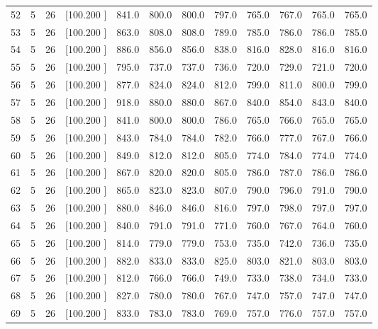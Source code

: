 \documentclass[12pt,a4paper]{article}
\begin{document}
\begin{center}
{\begin{tabular}{r r r r r r r r r r r r}
  52&  5& 26&[100.200   ]&   841.0&   800.0&   800.0&   797.0&   765.0&   767.0&   765.0&   765.0\\[-0.02in]
  53&  5& 26&[100.200   ]&   863.0&   808.0&   808.0&   789.0&   785.0&   786.0&   786.0&   785.0\\[-0.02in]
  54&  5& 26&[100.200   ]&   886.0&   856.0&   856.0&   838.0&   816.0&   828.0&   816.0&   816.0\\[-0.02in]
  55&  5& 26&[100.200   ]&   795.0&   737.0&   737.0&   736.0&   720.0&   729.0&   721.0&   720.0\\[-0.02in]
  56&  5& 26&[100.200   ]&   877.0&   824.0&   824.0&   812.0&   799.0&   811.0&   800.0&   799.0\\[-0.02in]
  57&  5& 26&[100.200   ]&   918.0&   880.0&   880.0&   867.0&   840.0&   854.0&   843.0&   840.0\\[-0.02in]
  58&  5& 26&[100.200   ]&   841.0&   800.0&   800.0&   786.0&   765.0&   766.0&   765.0&   765.0\\[-0.02in]
  59&  5& 26&[100.200   ]&   843.0&   784.0&   784.0&   782.0&   766.0&   777.0&   767.0&   766.0\\[-0.02in]
  60&  5& 26&[100.200   ]&   849.0&   812.0&   812.0&   805.0&   774.0&   784.0&   774.0&   774.0\\[-0.02in]
  61&  5& 26&[100.200   ]&   867.0&   820.0&   820.0&   805.0&   786.0&   787.0&   786.0&   786.0\\[-0.02in]
  62&  5& 26&[100.200   ]&   865.0&   823.0&   823.0&   807.0&   790.0&   796.0&   791.0&   790.0\\[-0.02in]
  63&  5& 26&[100.200   ]&   880.0&   846.0&   846.0&   816.0&   797.0&   798.0&   797.0&   797.0\\[-0.02in]
  64&  5& 26&[100.200   ]&   840.0&   791.0&   791.0&   771.0&   760.0&   767.0&   764.0&   760.0\\[-0.02in]
  65&  5& 26&[100.200   ]&   814.0&   779.0&   779.0&   753.0&   735.0&   742.0&   736.0&   735.0\\[-0.02in]
  66&  5& 26&[100.200   ]&   882.0&   833.0&   833.0&   825.0&   803.0&   821.0&   803.0&   803.0\\[-0.02in]
  67&  5& 26&[100.200   ]&   812.0&   766.0&   766.0&   749.0&   733.0&   738.0&   734.0&   733.0\\[-0.02in]
  68&  5& 26&[100.200   ]&   827.0&   780.0&   780.0&   767.0&   747.0&   757.0&   747.0&   747.0\\[-0.02in]
  69&  5& 26&[100.200   ]&   833.0&   783.0&   783.0&   769.0&   757.0&   776.0&   757.0&   757.0\\[-0.02in]

\end{tabular}}
\end{center}
\end{document}
